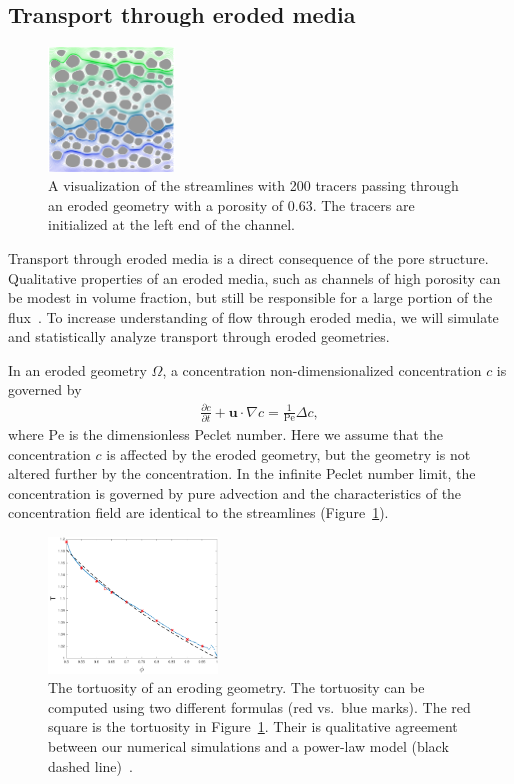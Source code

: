 \documentclass[11pt]{article}
\newcommand{\pd}[2]{ \frac{ \partial #1}{ \partial #2 } }
\newcommand{\bvec}[1]{{\mathbf{#1}}}
\newcommand{\Pe}{\mathrm{Pe}}
\newcommand{\uu}{\bvec{u}}
\begin{document}
\subsection{Transport through eroded media}
\begin{figure}
  \includegraphics[width=0.3\textwidth]{figs/100b_t100tracer}
  \caption{\label{fig:100tracers} A visualization of the streamlines
  with 200 tracers passing through an eroded geometry with a porosity of
  0.63. The tracers are initialized at the left end of the channel.}
\end{figure}
Transport through eroded media is a direct consequence of the pore
structure. Qualitative properties of an eroded media, such as channels
of high porosity can be modest in volume fraction, but still be
responsible for a large portion of the flux~\cite{Quaife2018}. To
increase understanding of flow through eroded media, we will simulate
and statistically analyze transport through eroded geometries.

In an eroded geometry $\Omega$, a concentration non-dimensionalized
concentration $c$ is governed by
\begin{align}
  \pd{c}{t} + \uu \cdot \nabla c = \frac{1}{\Pe} \Delta c, 
  \label{eqn:advectionDiffusion}
\end{align}
where $\Pe$ is the dimensionless Peclet number. Here we assume that the
concentration $c$ is affected by the eroded geometry, but the geometry
is not altered further by the concentration. In the infinite Peclet
number limit, the concentration is governed by pure advection and the
characteristics of the concentration field are identical to the
streamlines (Figure~\ref{fig:100tracers}).
\begin{figure}
  \includegraphics[width=0.4\textwidth]{figs/tort_eulerian100}
  \caption{\label{fig:100tortuosity} The tortuosity of an eroding
  geometry. The tortuosity can be computed using two different formulas
  (red vs.~blue marks). The red square is the tortuosity in
  Figure~\ref{fig:100tracers}. Their is qualitative agreement between
  our numerical simulations and a power-law model (black dashed
  line)~\cite{mat-kha-koz2008}.}
\end{figure}
\end{document}
